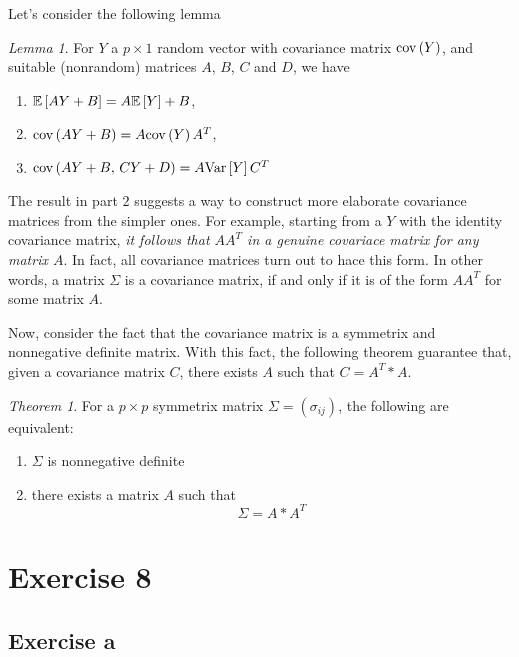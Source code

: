 \documentclass[11pt]{article}
\theoremstyle{definition}
\theoremstyle{remark}
\theoremstyle{remark}
\theoremstyle{remark}
\newtheorem{theorem}{Theorem}
\theoremstyle{proof}
\newtheorem{lemma}{Lemma}
\begin{document}
Let's consider the following lemma

\begin{lemma}
  For $Y$ a $p \times 1$ random vector with covariance matrix $\cov{Y}$, and
  suitable (nonrandom) matrices $A$, $B$, $C$ and $D$, we have
\begin{enumerate}
  \item $\E{AY + B} = A\E{Y} +B$,
  \item $\cov{AY + B} = A\cov{Y}A^{T}$,
  \item $\cov{AY + B, \,CY + D} = A\V{Y}C^{T}$
\end{enumerate}
\end{lemma}

The result in part $2$ suggests a way to construct more elaborate covariance
matrices from the simpler ones. For example, starting from a $Y$ with the
identity covariance matrix, \textit{it follows that $AA^{T}$ in a genuine
  covariace matrix for any matrix $A$}. In fact, all covariance matrices turn
out to hace this form. In other words, a matrix $\Sigma$ is a covariance matrix,
if and only if it is of the form $AA^{T}$ for some matrix $A$.

Now, consider the fact that the covariance matrix is a symmetrix and nonnegative
definite matrix. With this fact, the following theorem guarantee that, given a
covariance matrix $C$, there exists $A$ such that $C = A^{T}*A$.

\begin{theorem}
  For a $p \times p$ symmetrix matrix $\Sigma = (\sigma_{ij})$, the following
  are equivalent:
\begin{enumerate}
  \item $\Sigma$ is nonnegative definite
  \item there exists a matrix $A$ such that
    \[
    \Sigma = A*A^{T}
    \]
\end{enumerate}
\end{theorem}

\section*{Exercise 8}
\subsection*{Exercise a}
\end{document}
